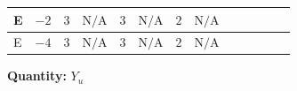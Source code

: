 \documentclass[8pt]{article}
\begin{document}
\begin{landscape}
\begin{longtable}{@{}llcccccc >{\raggedright\arraybackslash}p{0.21\linewidth} >{\raggedright\arraybackslash}p{0.21\linewidth} >{\raggedright\arraybackslash}p{0.21\linewidth}@{}}
E & $-2$ & $3$ & $\text{N/A}$ & $3$ & $\text{N/A}$ & $2$ & $\text{N/A}$ & \scriptsize\adjustbox{max width=\linewidth}{$\begin{gathered} -\frac{3}{2} (\left({Y_d}\,\left({Y_d}\right)^{\dagger}\,{Y_u}\right)_{ij}-\left({Y_u}\,\left({Y_u}\right)^{\dagger}\,{Y_u}\right)_{ij})\end{gathered}$} & \scriptsize\adjustbox{max width=\linewidth}{$\begin{gathered} -\frac{9}{4} {g_2}^2 \left({Y_u}\right)_{ij}\end{gathered}$} & \scriptsize\adjustbox{max width=\linewidth}{$\begin{gathered} -8 {g_3}^2 \left({Y_u}\right)_{ij}\end{gathered}$} \\
\midrule
E & $-4$ & $3$ & $\text{N/A}$ & $3$ & $\text{N/A}$ & $2$ & $\text{N/A}$ & \scriptsize\adjustbox{max width=\linewidth}{$\begin{gathered} -\frac{3}{2} (\left({Y_d}\,\left({Y_d}\right)^{\dagger}\,{Y_u}\right)_{ij}-\left({Y_u}\,\left({Y_u}\right)^{\dagger}\,{Y_u}\right)_{ij})\end{gathered}$} & \scriptsize\adjustbox{max width=\linewidth}{$\begin{gathered} -\frac{9}{4} {g_2}^2 \left({Y_u}\right)_{ij}\end{gathered}$} & \scriptsize\adjustbox{max width=\linewidth}{$\begin{gathered} -8 {g_3}^2 \left({Y_u}\right)_{ij}\end{gathered}$} \\
\midrule
\bottomrule
\end{longtable}
\clearpage
\noindent\textbf{Quantity: }$Y_u$\par\smallskip

\end{landscape}
\end{document}

